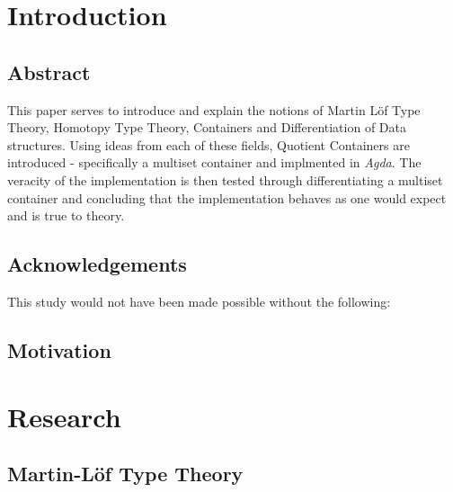 \documentclass[12pt]{report}
\begin{document}
\part{Introduction}

\chapter{Abstract}


This paper serves to introduce and explain the notions of Martin L\"of Type Theory, Homotopy Type Theory, Containers and Differentiation of Data structures. Using ideas from each of these fields, Quotient Containers are introduced - specifically a multiset container and implmented in \textit{Agda}. The veracity of the implementation is then tested through differentiating a multiset container and concluding that the implementation behaves as one would expect and is true to theory.

\chapter{Acknowledgements}
This study would not have been made possible without the following:

\chapter{Motivation}

\part{Research}

\chapter{Martin-L\"of Type Theory}
\end{document}
